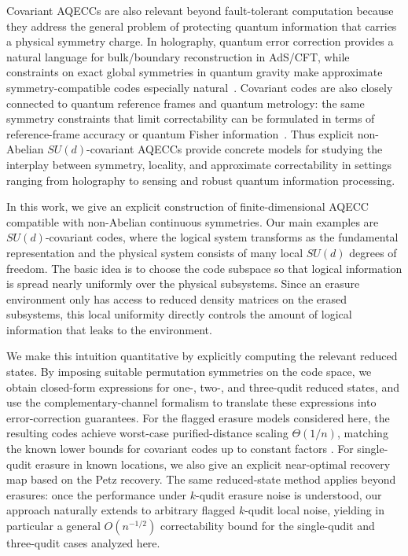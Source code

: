 \documentclass[10pt,twocolumn,superscriptaddress,aps,amsmath,amssymb,citeautoscript,floatfix,prx,longbibliography]{revtex4-2}
\theoremstyle{plain}
\theoremstyle{plain}
\theoremstyle{plain}
\theoremstyle{plain}
\theoremstyle{plain}
\theoremstyle{plain}
\begin{document}
Covariant AQECCs are also relevant beyond fault-tolerant computation because they address the general problem of protecting quantum information that carries a physical symmetry charge. In holography, quantum error correction provides a natural language for bulk/boundary reconstruction in AdS/CFT, while constraints on exact global symmetries in quantum gravity make approximate symmetry-compatible codes especially natural~\cite{Almheiri2015,Pastawski2015,HarlowOoguri2019}. Covariant codes are also closely connected to quantum reference frames and quantum metrology: the same symmetry constraints that limit correctability can be formulated in terms of reference-frame accuracy or quantum Fisher information~\cite{Hayden2021,Woods2020,Kubica2021}. Thus explicit non-Abelian \(SU(d)\)-covariant AQECCs provide concrete models for studying the interplay between symmetry, locality, and approximate correctability in settings ranging from holography to sensing and robust quantum information processing.

In this work, we give an explicit construction of finite-dimensional AQECC compatible with non-Abelian continuous symmetries. Our main examples are \(SU(d)\)-covariant codes, where the logical system
transforms as the fundamental representation and the physical system consists of many local \(SU(d)\) degrees of freedom. The basic idea is to choose the code subspace so that logical information is spread nearly uniformly over the physical subsystems. Since an erasure environment only has access to reduced density matrices on the erased subsystems, this local uniformity directly controls the amount of logical information that leaks to the environment.

We make this intuition quantitative by explicitly computing the relevant reduced states. By imposing suitable permutation symmetries on the code space, we obtain closed-form expressions for one-, two-, and three-qudit reduced states,
and use the complementary-channel formalism to translate these expressions into error-correction guarantees. For the flagged erasure models considered here, the resulting codes achieve worst-case purified-distance scaling \(\Theta(1/n)\), matching the
known lower bounds for covariant codes up to constant factors
\cite{Faist2020,Zhou2021}. For single-qudit erasure in known locations, we also give an explicit near-optimal recovery map based on the Petz recovery. The same reduced-state method applies beyond erasures: once the performance under \(k\)-qudit erasure noise is understood, our approach naturally extends to arbitrary flagged \(k\)-qudit local noise, yielding in particular a general \(O(n^{-1/2})\) correctability bound for the single-qudit and three-qudit cases analyzed here.
\end{document}
